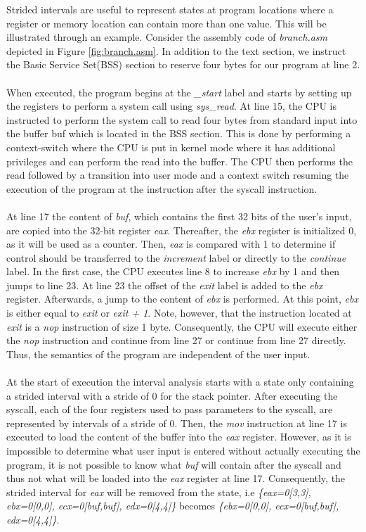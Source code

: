 \documentclass{kththesis}
\renewcommand{\it}[1]{\textit{#1}}
\begin{document}
\clearpage
\noindent
Strided intervals are useful to represent states at program locations where a register or memory location can contain more than one value. This will be illustrated through an example. Consider the assembly code of \it{branch.asm} depicted in Figure \ref{fig:branch.asm}. In addition to the text section, we instruct the Basic Service Set(BSS) section to reserve four bytes for our program at line 2. 
\\ \\
When executed, the program begins at the \it{\_start} label and starts by setting up the registers to perform a system call using \it{sys\_read}. At line 15, the CPU is instructed to perform the system call to read four bytes from standard input into the buffer buf which is located in the BSS section. This is done by performing a context-switch where the CPU is put in kernel mode where it has additional privileges and can perform the read into the buffer. The CPU then performs the read followed by a transition into user mode and a context switch resuming the execution of the program at the instruction after the syscall instruction.
\\ \\ 
At line 17 the content of \it{buf}, which contains the first 32 bits of the user's input, are copied into the 32-bit register \it{eax}. Thereafter, the \it{ebx} register is initialized 0, as it will be used as a counter. Then, \it{eax} is compared with 1 to determine if control should be transferred to the \it{increment} label or directly to the \it{continue} label. In the first case, the CPU executes line 8 to increase \it{ebx} by 1 and then jumps to line 23. At line 23 the offset of the \it{exit} label is added to the \it{ebx} register. Afterwards, a jump to the content of \it{ebx} is performed. At this point, \it{ebx} is either equal to \it{exit} or \it{exit + 1}. Note, however, that the instruction located at \it{exit} is a \it{nop} instruction of size 1 byte. Consequently, the CPU will execute either the \it{nop} instruction and continue from line 27 or continue from line 27 directly. Thus, the semantics of the program are independent of the user input. 
\\ \\
At the start of execution the interval analysis starts with a state only containing a strided interval with a stride of 0 for the stack pointer. After executing the syscall, each of the four registers used to pass parameters to the syscall, are represented by intervals of a stride of 0. Then, the \it{mov} instruction at line 17 is executed to load the content of the buffer into the \it{eax} register. However, as it is impossible to determine what user input is entered without actually executing the program, it is not possible to know what \it{buf} will contain after the syscall and thus not what will be loaded into the \it{eax} register at line 17. Consequently, the strided interval for \it{eax} will be removed from the state, i.e \it{\{eax=0[3,3], ebx=0[0,0], ecx=0[buf,buf], edx=0[4,4]\}} becomes \it{\{ebx=0[0,0], ecx=0[buf,buf], edx=0[4,4]\}}.
\end{document}
